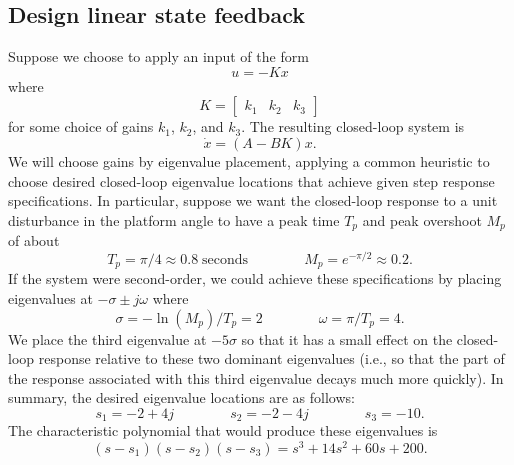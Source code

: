 \documentclass[conf]{new-aiaa}
\begin{document}
\subsection{Design linear state feedback}
\label{sec-design}

Suppose we choose to apply an input of the form
\begin{equation}
u = - Kx
\end{equation}
where
\begin{equation}
K = \begin{bmatrix} k_{1} & k_{2} & k_{3} \end{bmatrix}
\end{equation}
for some choice of gains $k_{1}$, $k_{2}$, and $k_{3}$. The resulting closed-loop system is
\begin{equation}
\dot{x} = (A - BK) x.
\label{eq-closedloop}
\end{equation}
We will choose gains by eigenvalue placement, applying a common heuristic to choose desired closed-loop eigenvalue locations that achieve given step response specifications\cite{Astrom2021}.
In particular, suppose we want the closed-loop response to a unit disturbance in the platform angle to have a peak time $T_{p}$ and peak overshoot $M_{p}$ of about
\begin{equation}
T_{p} = \pi / 4 \approx 0.8\;\text{seconds}
\qquad\qquad
M_{p} = e^{-\pi / 2} \approx 0.2.
\label{eq-peaktargets}
\end{equation}
If the system were second-order, we could achieve these specifications by placing eigenvalues at $-\sigma \pm j\omega$ where
\begin{equation}
\sigma = -\ln(M_{p}) / T_{p} = 2
\qquad\qquad
\omega = \pi / T_{p} = 4.
\label{eq-heuristic}
\end{equation}
We place the third eigenvalue at $-5\sigma$ so that it has a small effect on the closed-loop response relative to these two dominant eigenvalues (i.e., so that the part of the response associated with this third eigenvalue decays much more quickly). In summary, the desired eigenvalue locations are as follows:
\begin{equation}
s_{1} = -2+4j
\qquad\qquad
s_{2} = -2-4j
\qquad\qquad
s_{3} = -10.
\label{eq-eigs}
\end{equation}
The characteristic polynomial that would produce these eigenvalues is
\begin{equation}
(s - s_{1}) (s - s_{2})(s - s_{3}) = s^{3} + 14 s^{2} + 60 s + 200.
\label{eq-charpoly-want}
\end{equation}
\end{document}
